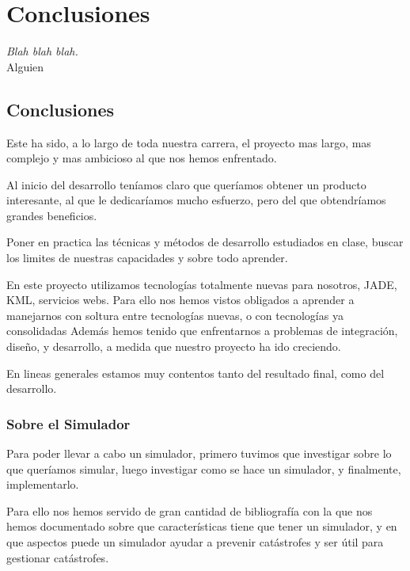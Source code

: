 
\chapter*{Conclusiones} \label{cap7}

\begin{flushright}
\begin{minipage}{7.85cm}
    {\em Blah blah blah.} \\  Alguien
\end{minipage}
\end{flushright}

\vspace*{5mm}

\section*{Conclusiones}
Este ha sido, a lo largo de toda nuestra carrera, el proyecto mas largo, mas
complejo y mas ambicioso al que nos hemos enfrentado.

Al inicio del desarrollo teníamos claro que queríamos obtener un producto
interesante, al que le dedicaríamos mucho esfuerzo, pero del que obtendríamos
grandes beneficios.

Poner en practica las técnicas y métodos de desarrollo estudiados en clase,
buscar los limites de nuestras capacidades y sobre todo aprender.

En este proyecto utilizamos tecnologías totalmente nuevas para nosotros, JADE,
KML, servicios webs.
Para ello nos hemos vistos obligados a aprender a manejarnos con soltura entre
tecnologías nuevas, o con tecnologías ya consolidadas 
Además hemos tenido que enfrentarnos a problemas de integración, diseño, y
desarrollo, a medida que nuestro proyecto ha ido creciendo.

En lineas generales estamos muy contentos tanto del resultado final, como del
desarrollo.
\subsection*{Sobre el Simulador}
Para poder llevar a cabo un simulador, primero tuvimos que investigar sobre lo
que queríamos simular, luego investigar como se hace un simulador, y
finalmente, implementarlo.

Para ello nos hemos servido de gran cantidad de bibliografía con la que nos
hemos documentado sobre que características tiene que tener un simulador, y en
que aspectos puede un simulador ayudar a prevenir catástrofes y ser útil para
gestionar catástrofes.

